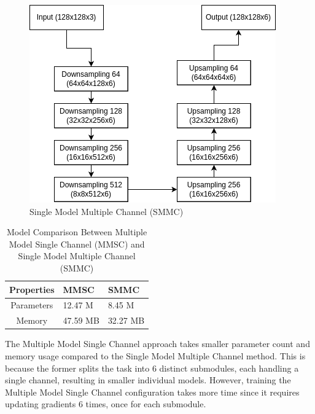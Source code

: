 \documentclass[conference]{IEEEtran}
\begin{document}
\begin{figure}[t!]
    \centering
    \includegraphics[width=\columnwidth]{single_model.png} %
    \caption{Single Model Multiple Channel (SMMC)}
    \label{fig:single}
\end{figure}

\begin{table}[h!]
    \centering
    \caption{Model Comparison Between Multiple Model Single Channel (MMSC) and Single Model Multiple Channel (SMMC)}
    \label{tab:model_compare_dims}
    
    \begin{tabularx}{\columnwidth}{|c|Y|Y|}
        \hline
        \textbf{Properties} & \textbf{MMSC} & \textbf{SMMC} \\
        \hline
        Parameters & 12.47 M & 8.45 M \\
        \hline
        Memory & 47.59 MB & 32.27 MB \\
        \hline
    \end{tabularx}
\end{table}

The Multiple Model Single Channel approach takes smaller parameter count and memory usage compared to the Single Model Multiple Channel method. This is because the former splits the task into 6 distinct submodules, each handling a single channel, resulting in smaller individual models. However, training the Multiple Model Single Channel configuration takes more time since it requires updating gradients 6 times, once for each submodule.
\end{document}
